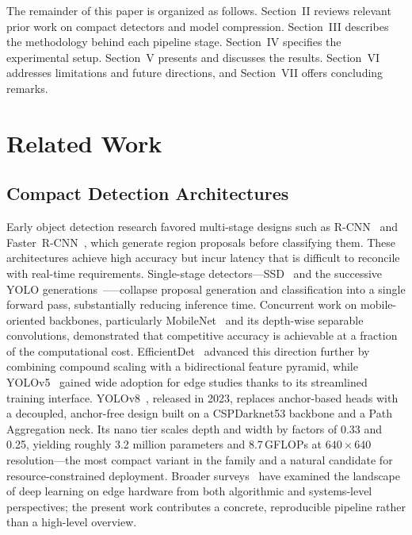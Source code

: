 \documentclass[conference]{IEEEtran}
\begin{document}
The remainder of this paper is organized as follows. Section~II reviews relevant prior work on compact detectors and model compression. Section~III describes the methodology behind each pipeline stage. Section~IV specifies the experimental setup. Section~V presents and discusses the results. Section~VI addresses limitations and future directions, and Section~VII offers concluding remarks.


\section{Related Work}

\subsection{Compact Detection Architectures}

Early object detection research favored multi-stage designs such as R-CNN~\cite{b2} and Faster~R-CNN~\cite{b3}, which generate region proposals before classifying them. These architectures achieve high accuracy but incur latency that is difficult to reconcile with real-time requirements. Single-stage detectors---SSD~\cite{b4} and the successive YOLO generations~\cite{b5}--\cite{b9}---collapse proposal generation and classification into a single forward pass, substantially reducing inference time. Concurrent work on mobile-oriented backbones, particularly MobileNet~\cite{b18} and its depth-wise separable convolutions, demonstrated that competitive accuracy is achievable at a fraction of the computational cost. EfficientDet~\cite{b19} advanced this direction further by combining compound scaling with a bidirectional feature pyramid, while YOLOv5~\cite{b20} gained wide adoption for edge studies thanks to its streamlined training interface. YOLOv8~\cite{b9}, released in 2023, replaces anchor-based heads with a decoupled, anchor-free design built on a CSPDarknet53 backbone and a Path Aggregation neck. Its nano tier scales depth and width by factors of 0.33 and 0.25, yielding roughly 3.2 million parameters and 8.7\,GFLOPs at $640{\times}640$ resolution---the most compact variant in the family and a natural candidate for resource-constrained deployment. Broader surveys~\cite{b21} have examined the landscape of deep learning on edge hardware from both algorithmic and systems-level perspectives; the present work contributes a concrete, reproducible pipeline rather than a high-level overview.
\end{document}
